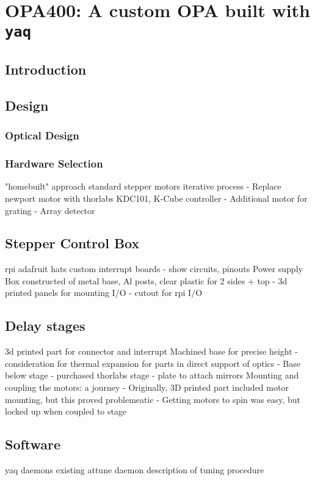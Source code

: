 \chapter{OPA400: A custom OPA built with \texttt{yaq}} \label{cha:opa400}

\clearpage

\section{Introduction}  %

\clearpage

\section{Design}  %

\subsection{Optical Design}

\subsection{Hardware Selection}
"homebuilt" approach
standard stepper motors
iterative process
  - Replace newport motor with thorlabs KDC101, K-Cube controller
  - Additional motor for grating
  - Array detector

\section{Stepper Control Box}  %

rpi
adafruit hats
custom interrupt boards
 - show circuits, pinouts
Power supply
Box constructed of metal base, Al posts, clear plastic for 2 sides + top
  - 3d printed panels for mounting I/O
  - cutout for rpi I/O

\section{Delay stages}  %

3d printed part for connector and interrupt
Machined base for precise height
  - consideration for thermal expansion for parts in direct support of optics
  - Base below stage
  - purchased thorlabs stage
  - plate to attach mirrors
Mounting and coupling the motors: a journey
  - Originally, 3D printed part included motor mounting, but this proved problemeatic
  - Getting motors to spin was easy, but locked up when coupled to stage


\clearpage

\section{Software}  %

yaq daemons 
existing attune daemon
description of tuning procedure


\clearpage
